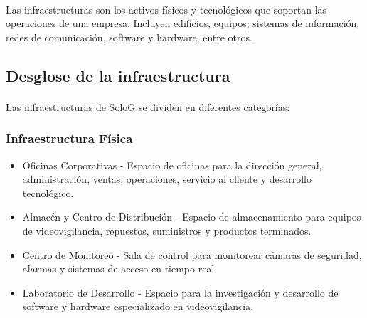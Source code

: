 \documentclass{report}
\begin{document}
          \paragraph*{}
          {
            Las infraestructuras son los activos físicos y tecnológicos que soportan las operaciones de una empresa. 
            Incluyen edificios, equipos, sistemas de información, redes de comunicación, software y hardware, entre otros.
          }
          \subsection{Desglose de la infraestructura}
            \paragraph*{}
            {
              Las infraestructuras de SoloG se dividen en diferentes categorías:
            }
            \subsubsection*{Infraestructura Física}
              \begin{itemize}
                \item Oficinas Corporativas - Espacio de oficinas para la dirección general, administración, ventas, operaciones, servicio al cliente y desarrollo tecnológico.
                \item Almacén y Centro de Distribución - Espacio de almacenamiento para equipos de videovigilancia, repuestos, suministros y productos terminados.
                \item Centro de Monitoreo - Sala de control para monitorear cámaras de seguridad, alarmas y sistemas de acceso en tiempo real.
                \item Laboratorio de Desarrollo - Espacio para la investigación y desarrollo de software y hardware especializado en videovigilancia.
              \end{itemize}
\end{document}
